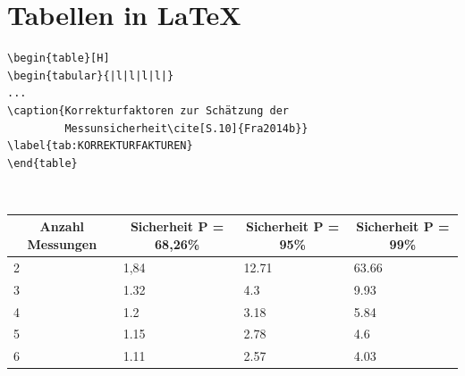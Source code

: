 \documentclass[TGAI_Laborbericht.tex]{subfiles}
\begin{document}
\section{Tabellen in \LaTeX}

\begin{lstlisting}[style=LATEX, frame=single, caption=\LaTeX ~Tabellen Prototyp, captionpos=b, label=lst:MATH_FORM]
\begin{table}[H]
\begin{tabular}{|l|l|l|l|}
...
\caption{Korrekturfaktoren zur Schätzung der 
         Messunsicherheit\cite[S.10]{Fra2014b}}
\label{tab:KORREKTURFAKTUREN}
\end{table}
\end{lstlisting}
~

\begin{table}[H]
\begin{tabular}{|l|l|l|l|}
\hline
\multicolumn{1}{|c|}{Anzahl Messungen} & \multicolumn{1}{c|}{Sicherheit P = 68,26\%} & \multicolumn{1}{c|}{Sicherheit P = 95\%} & \multicolumn{1}{c|}{Sicherheit P = 99\%} \\ \hline
2                                                              & 1,84                                                                & 12.71                                                            & 63.66                                                            \\ \hline
3                                                              & 1.32                                                                & 4.3                                                              & 9.93                                                             \\ \hline
4                                                              & 1.2                                                                 & 3.18                                                             & 5.84                                                             \\ \hline
5                                                              & 1.15                                                                & 2.78                                                             & 4.6                                                              \\ \hline
6                                                              & 1.11                                                                & 2.57                                                             & 4.03                                                             \\ \hline

\end{tabular}
\end{table}
\end{document}
